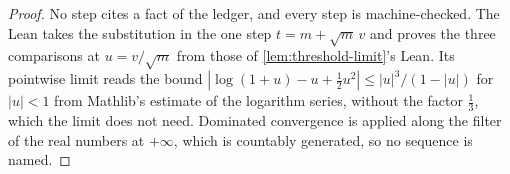 \begin{proof}
No step cites a fact of the ledger, and every step is machine-checked. The Lean takes the
substitution in the one step $t = m + \sqrt m\,v$ and proves the three comparisons at
$u = v/\sqrt m$ from those of \ref{lem:threshold-limit}'s Lean. Its pointwise limit reads the
bound $|\log(1+u) - u + \tfrac12 u^2| \le |u|^3/(1 - |u|)$ for $|u| < 1$ from Mathlib's estimate
of the logarithm series, without the factor $\tfrac13$, which the limit does not need. Dominated
convergence is applied along the filter of the real numbers at $+\infty$, which is countably
generated, so no sequence is named.
\end{proof}


